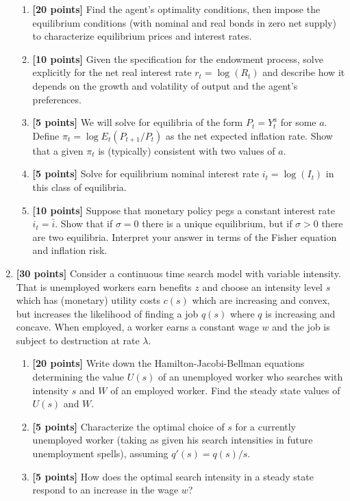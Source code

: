 \documentclass[12pt]{article}
\begin{document}
\begin{enumerate}
\begin{enumerate}
\item \textbf{[20 points]} Find the agent's optimality conditions, then impose the equilibrium conditions (with nominal and real bonds in zero net supply) to characterize equilibrium prices and interest rates.
\item \textbf{[10 points]} Given the specification for the endowment process, solve explicitly for the net real interest rate $r_t=\log(R_t)$ and describe how it depends on the growth and volatility of output and the agent's preferences.
\item \textbf{[5 points]} We will solve for equilibria of the form $P_t = Y_t^a$ for some $a$. Define $\pi_t = \log E_t (P_{t+1}/P_t)$ as the net expected inflation rate.  Show that a given $\pi_t$ is (typically) consistent with two values of $a$.
\item \textbf{[5 points]} Solve for equilibrium nominal interest rate $i_t = \log(I_t)$ in this class of equilibria.  
\item \textbf{[10 points]} Suppose that monetary policy pegs a constant interest rate $i_t = \bar i$.  Show that if $\sigma = 0$ there is a unique equilibrium, but if $\sigma>0$ there are two equilibria.  Interpret your answer in terms of the Fisher equation and inflation risk.
\end{enumerate}


\item  \textbf{[30 points]} Consider a continuous time search model with variable intensity.  That is unemployed workers earn benefits $z$ and choose an intensity level $s$ which has (monetary) utility costs $c(s)$ which are increasing and convex, but increases the likelihood of finding a job $q(s)$ where $q$ is increasing and concave.  When employed, a worker earns a constant wage $w$ and the job is subject to destruction at rate $\lambda$.
\begin{enumerate}
\item \textbf{[20 points]} Write down the Hamilton-Jacobi-Bellman equations determining the value $U(s)$ of an unemployed worker who searches with intensity $s$ and $W$ of an employed worker.  Find the steady state values of $U(s)$ and $W$.
\item  \textbf{[5 points]} Characterize the optimal choice of $s$ for a currently unemployed worker (taking as given his search intensities in future unemployment spells), assuming $q'(s)=q(s)/s$.
\item  \textbf{[5 points]} How does the optimal search intensity in a steady state respond to an increase in the wage $w$?
\end{enumerate}


\end{enumerate}
\end{document}
